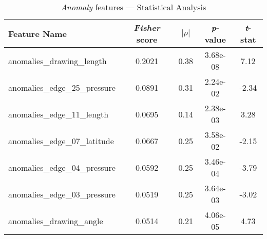 \begin{table}[htb]
    \centering
    \begin{tabular}
        {l*{1}{S[table-format=1.4]}
        *{1}{S[table-format=1.2]}
        *{1}{S[table-format=1.2e-2]}
        *{1}{S[table-format=-2.2]}}
        
    \toprule
    Feature Name &  {\textit{Fisher} score} & {$|\rho|$} & {\textit{p}-value} &  {\textit{t}-stat} \\
    \midrule
       anomalies\_drawing\_length &  0.2021 &  0.38 &  3.68e-08 &   7.12 \\
     anomalies\_edge\_25\_pressure &  0.0891 &  0.31 &  2.24e-02 &  -2.34 \\
       anomalies\_edge\_11\_length &  0.0695 &  0.14 &  2.38e-03 &   3.28 \\
     anomalies\_edge\_07\_latitude &  0.0667 &  0.25 &  3.58e-02 &  -2.15 \\
     anomalies\_edge\_04\_pressure &  0.0592 &  0.25 &  3.46e-04 &  -3.79 \\
     anomalies\_edge\_03\_pressure &  0.0519 &  0.25 &  3.64e-03 &  -3.02 \\
        anomalies\_drawing\_angle &  0.0514 &  0.21 &  4.06e-05 &   4.73 \\
    \bottomrule
    \end{tabular}
    \caption{\textit{Anomaly} features --- Statistical Analysis}\label{stat-anomaly}

\end{table}

